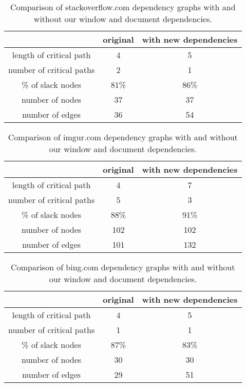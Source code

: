 \begin{table*}[tb]
\centering
\small
\begin{tabular}{|c|c|c|}
\hline
 & original & with new dependencies \\
\hline
length of critical path & 4 & 5 \\
number of critical paths & 2 & 1 \\
\% of slack nodes & 81\% & 86\% \\
number of nodes & 37 & 37 \\
number of edges & 36 & 54 \\
\hline
\end{tabular}\caption{Comparison of stackoverflow.com dependency graphs with and without our window and document dependencies.}
\label{t:stackoverflowgraph}
\end{table*}

\begin{table*}[tb]
\centering
\small
\begin{tabular}{|c|c|c|}
\hline
 & original & with new dependencies \\
\hline
length of critical path & 4 & 7 \\
number of critical paths & 5 & 3 \\
\% of slack nodes & 88\% & 91\% \\
number of nodes & 102 & 102 \\
number of edges & 101 & 132 \\
\hline
\end{tabular}\caption{Comparison of imgur.com dependency graphs with and without our window and document dependencies.}
\label{t:imgurgraph}
\end{table*}

\begin{table*}[tb]
\centering
\small
\begin{tabular}{|c|c|c|}
\hline
 & original & with new dependencies \\
\hline
length of critical path & 4 & 5 \\
number of critical paths & 1 & 1 \\
\% of slack nodes & 87\% & 83\% \\
number of nodes & 30 & 30 \\
number of edges & 29 & 51 \\
\hline
\end{tabular}\caption{Comparison of bing.com dependency graphs with and without our window and document dependencies.}
\label{t:binggraph}
\end{table*}

